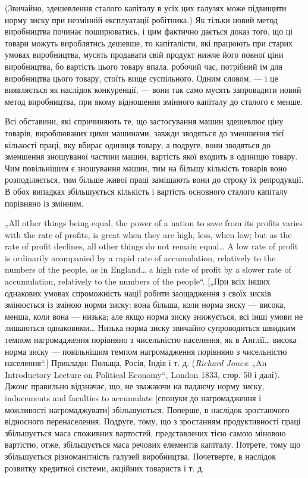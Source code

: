 \parcont{}  %
(Звичайно, здешевлення сталого капіталу в усіх цих галузях
може підвищити норму зиску при незмінній експлуатації робітника.)
Як тільки новий метод виробництва починає поширюватись,
і цим фактично дається доказ того, що ці товари можуть
вироблятись дешевше, то капіталісти, які працюють при старих
умовах виробництва, мусять продавати свій продукт нижче
його повної ціни виробництва, бо вартість цього товару впала,
робочий час, потрібний їм для виробництва цього товару, стоїть
вище суспільного. Одним словом, — і це виявляється як наслідок
конкуренції, — вони так само мусять запровадити новий метод
виробництва, при якому відношення змінного капіталу до
сталого є менше.

Всі обставини, які спричиняють те, що застосування машин
здешевлює ціну товарів, вироблюваних цими машинами,
завжди зводяться до зменшення тієї кількості праці, яку вбирає
одиниця товару; а подруге, вони зводяться до зменшення
зношуваної частини машин, вартість якої входить в одиницю
товару. Чим повільнішим є зношування машин, тим на більшу
кількість товарів воно розподіляється, тим більше живої праці
заміщають вони до строку їх репродукції. В обох випадках
збільшується кількість і вартість основного сталого капіталу
порівняно із змінним.

„All other things being equal, the power of a nation to save from
its profits varies with the rate of profits, is great when they are high,
less, when low; but as the rate of profit declines, all other things do
not remain equal\dots{} A low rate of profit is ordinarily acompanied by
a rapid rate of accumulation, relatively to the numbers of the people,
as in England\dots{} a high rate of profit by a slower rate of accumulation,
relatively to the numbers of the people“. [„При всіх інших
однакових умовах спроможність нації робити заощадження з своїх
зисків змінюється із зміною норми зиску; вона більша, коли
норма зиску — висока, менша, коли вона — низька; але якщо
норма зиску знижується, всі інші умови не лишаються однаковими\dots{}
Низька норма зиску звичайно супроводиться швидким
темпом нагромадження порівняно з чисельністю населення,
як в Англії\dots{} висока норма зиску — повільнішим темпом нагромадження
порівняно з чисельністю населення“.] Приклади: Польща,
Росія, Індія і т. д. (\emph{Richard Jones}: „An Introductory Lecture on Political
Economy“, London 1833, стор. 50 і далі). Джонс правильно відзначає,
що, не зважаючи на падаючу норму зиску, inducements
and faculties to accumulate [спонуки до нагромадження і можливості
нагромаджувати] збільшуються. Поперше, в наслідок зростаючого
відносного перенаселення. Подруге, тому, що з зростанням
продуктивності праці збільшується маса споживних вартостей,
представлених тією самою міновою вартістю, отже, збільшується
маса речових елементів капіталу. Потрете, тому що
збільшується різноманітність галузей виробництва. Почетверте,
в наслідок розвитку кредитної системи, акційних товариств і т. д.
\parbreak{}  %
